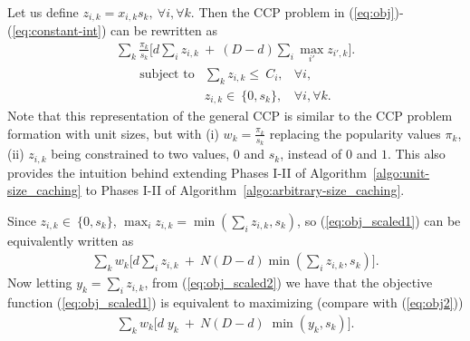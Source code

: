 \documentclass[conference]{IEEEtran}
\begin{document}
Let us define $z_{i,k} = x_{i,k} s_k, \ \forall i, \forall k$. Then the CCP problem in (\ref{eq:obj})-(\ref{eq:constant-int}) can be rewritten as
\begin{eqnarray}
\sum_k \frac{\pi_k}{s_k}  \bigg[ d \sum_i z_{i,k}  \ + \  (D-d)  \sum_i \max_{i'} z_{{i'},k} \bigg].
\label{eq:obj_scaled1}
\end{eqnarray}
\vspace{-0.2in}
\begin{eqnarray}
\mbox{subject to} & \sum_k z_{i,k}  \leq \  C_i, & \forall i, \label{eq:constant-cap_scaled}\\
& z_{i,k} \in \  \{0,s_k\}, & \forall i, \forall k. \label{eq:constant-int_scaled}
\end{eqnarray}
Note that this representation of the general CCP is similar to the CCP problem formation with unit sizes, but with (i) $w_k = \frac{\pi_k}{s_k}$ replacing the popularity values $\pi_k$, (ii) $z_{i,k}$ being constrained to two values, $0$ and $s_k$, instead of $0$ and $1$. This also provides the intuition behind extending Phases I-II of Algorithm~\ref{algo:unit-size_caching} to Phases I-II of Algorithm~\ref{algo:arbitrary-size_caching}.

Since $z_{i,k} \in \  \{0,s_k\}$, $\max_i z_{i,k} = \min (\sum_i z_{i,k}, s_k)$, so (\ref{eq:obj_scaled1}) can be equivalently written as
\begin{eqnarray}
\sum_k w_k  \bigg[ d \sum_i z_{i,k}  \ + \  N (D-d) \min (\sum_i z_{i,k}, s_k) \bigg].
\label{eq:obj_scaled2}
\end{eqnarray}
Now letting $y_k = \sum_i z_{i,k}$, from (\ref{eq:obj_scaled2}) we have that the objective function (\ref{eq:obj_scaled1}) is equivalent to maximizing (compare with (\ref{eq:obj2}))
\begin{eqnarray}
\sum_k w_k \bigg[ d\; y_k  \ + \  N (D-d)\; \min(y_k,s_k) \bigg].
\label{eq:obj2_scaled}
\end{eqnarray}
\end{document}
